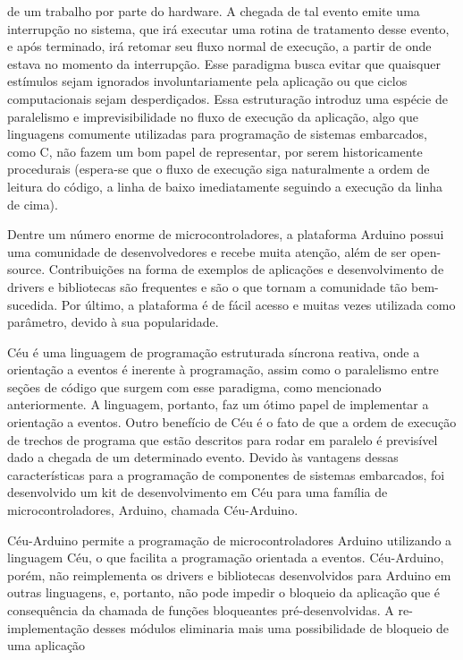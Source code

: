 \documentclass{article}
\begin{document}
de um trabalho por parte do hardware. A chegada de tal evento emite uma interrupção no sistema, que
irá executar uma rotina de tratamento desse evento, e após terminado, irá retomar seu fluxo normal
de execução, a partir de onde estava no momento da interrupção. Esse paradigma busca evitar que
quaisquer estímulos sejam ignorados involuntariamente pela aplicação ou que ciclos computacionais
sejam desperdiçados. Essa estruturação introduz uma espécie de paralelismo e imprevisibilidade no
fluxo de execução da aplicação, algo que linguagens comumente utilizadas para programação de
sistemas embarcados, como C, não fazem um bom papel de representar, por serem historicamente
procedurais (espera-se que o fluxo de execução siga naturalmente a ordem de leitura do código, a
linha de baixo imediatamente seguindo a execução da linha de cima).
\par Dentre um número enorme de microcontroladores, a plataforma Arduino possui uma comunidade de desenvolvedores e recebe muita atenção, além de ser open-source. Contribuições na forma de
exemplos de aplicações e desenvolvimento de drivers e bibliotecas são frequentes e são o que tornam
a comunidade tão bem-sucedida. Por último, a plataforma é de fácil acesso e muitas vezes utilizada
como parâmetro, devido à sua popularidade. \cite{arduinoblog}
\par Céu é uma linguagem de programação estruturada síncrona reativa, onde a orientação a eventos é
inerente à programação, assim como o paralelismo entre seções de código que surgem com esse
paradigma, como mencionado anteriormente. A linguagem, portanto, faz um ótimo papel de
implementar a orientação a eventos. Outro benefício de Céu é o fato de que a ordem de execução de
trechos de programa que estão descritos para rodar em paralelo é previsível dado a chegada de um
determinado evento. \cite{santanna2012} Devido às vantagens dessas características para a programação de
componentes de sistemas embarcados, foi desenvolvido um kit de desenvolvimento em Céu para
uma família de microcontroladores, Arduino, chamada Céu-Arduino.
\par Céu-Arduino permite a programação de microcontroladores Arduino utilizando a linguagem Céu, o
que facilita a programação orientada a eventos. Céu-Arduino, porém, não reimplementa os drivers e
bibliotecas desenvolvidos para Arduino em outras linguagens, e, portanto, não pode impedir o
bloqueio da aplicação que é consequência da chamada de funções bloqueantes pré-desenvolvidas. A
re-implementação desses módulos eliminaria mais uma possibilidade de bloqueio de uma aplicação
\end{document}
